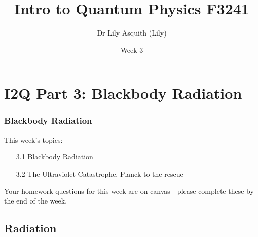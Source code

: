


% 
\title[ Intro to Quantum Physics]{Intro to Quantum Physics F3241}
\author[Dr Lily Asquith (Lily)]{ Dr Lily Asquith (Lily)}
\date[Week 3]{ Week 3}





\begin{frame}
\titlepage
\end{frame} 

\section{I2Q Part 3: Blackbody Radiation}
\begin{frame}
\frametitle{Blackbody Radiation} 
\normalsize

This week's topics:\\[3ex]

\begin{itemize}
\item[3.1] Blackbody Radiation\\[3ex]
\item[3.2] The Ultraviolet Catastrophe, Planck to the rescue\\[3ex]
\end{itemize}

Your homework questions for this week are on canvas - please complete these by the end of the week.
\end{frame} 
 
 
 \subsection{Radiation}

